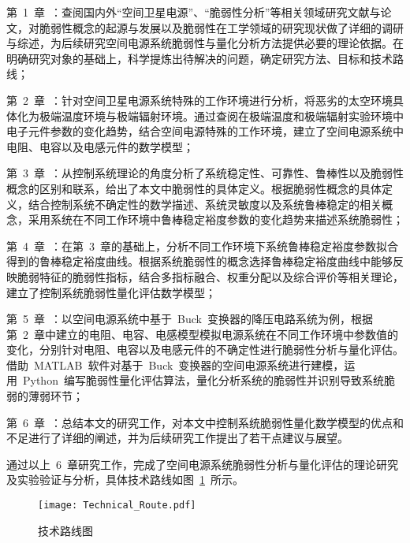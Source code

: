 第~1~章~：查阅国内外“空间卫星电源”、“脆弱性分析”等相关领域研究文献与论文，对脆弱性概念的起源与发展以及脆弱性在工学领域的研究现状做了详细的调研与综述，为后续研究空间电源系统脆弱性与量化分析方法提供必要的理论依据。在明确研究对象的基础上，科学提炼出待解决的问题，确定研究方法、目标和技术路线；

第~2~章~：针对空间卫星电源系统特殊的工作环境进行分析，将恶劣的太空环境具体化为极端温度环境与极端辐射环境。通过查阅在极端温度和极端辐射实验环境中电子元件参数的变化趋势，结合空间电源特殊的工作环境，建立了空间电源系统中电阻、电容以及电感元件的数学模型；

第~3~章~：从控制系统理论的角度分析了系统稳定性、可靠性、鲁棒性以及脆弱性概念的区别和联系，给出了本文中脆弱性的具体定义。根据脆弱性概念的具体定义，结合控制系统不确定性的数学描述、系统灵敏度以及系统鲁棒稳定的相关概念，采用系统在不同工作环境中鲁棒稳定裕度参数的变化趋势来描述系统脆弱性；

第~4~章~：在第~3~章的基础上，分析不同工作环境下系统鲁棒稳定裕度参数拟合得到的鲁棒稳定裕度曲线。根据系统脆弱性的概念选择鲁棒稳定裕度曲线中能够反映脆弱特征的脆弱性指标，结合多指标融合、权重分配以及综合评价等相关理论，建立了控制系统脆弱性量化评估数学模型；

第~5~章~：以空间电源系统中基于~Buck~变换器的降压电路系统为例，根据第~2~章中建立的电阻、电容、电感模型模拟电源系统在不同工作环境中参数值的变化，分别针对电阻、电容以及电感元件的不确定性进行脆弱性分析与量化评估。借助~MATLAB~软件对基于~Buck~变换器的空间电源系统进行建模，运用~Python~编写脆弱性量化评估算法，量化分析系统的脆弱性并识别导致系统脆弱的薄弱环节；

第~6~章~：总结本文的研究工作，对本文中控制系统脆弱性量化数学模型的优点和不足进行了详细的阐述，并为后续研究工作提出了若干点建议与展望。

\bigskip
通过以上~6~章研究工作，完成了空间电源系统脆弱性分析与量化评估的理论研究及实验验证与分析，具体技术路线如图~\ref{fig:chap1:step}~所示。
\begin{figure}[hbp]
  \centering
  \texttt{[image: Technical\_Route.pdf]}\\
  \caption{技术路线图}\label{fig:chap1:step}
\end{figure}

